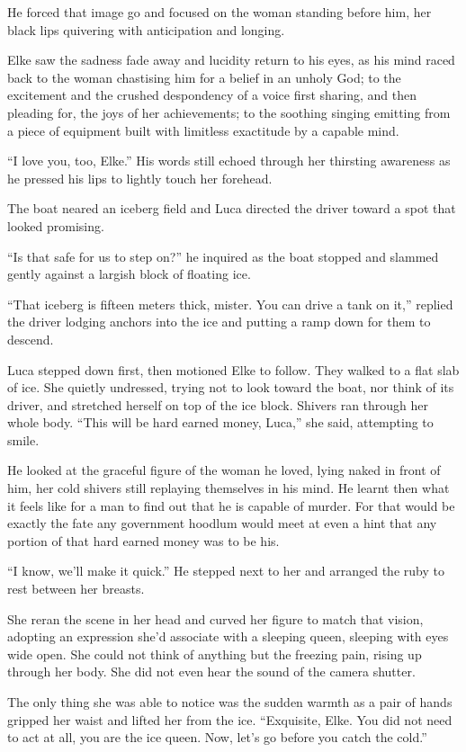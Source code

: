 He forced that image go and focused on the woman standing before him, her black lips quivering with anticipation and longing.

Elke saw the sadness fade away and lucidity return to his eyes, as his mind raced back to the woman chastising him for a belief in an unholy God; to the excitement and the crushed despondency of a voice first sharing, and then pleading for, the joys of her achievements; to the soothing singing emitting from a piece of equipment built with limitless exactitude by a capable mind.

``I love you, too, Elke.'' His words still echoed through her thirsting awareness as he pressed his lips to lightly touch her forehead.

The boat neared an iceberg field and Luca directed the driver toward a spot that looked promising.

``Is that safe for us to step on?'' he inquired as the boat stopped and slammed gently against a largish block of floating ice.

``That iceberg is fifteen meters thick, mister. You can drive a tank on it,'' replied the driver lodging anchors into the ice and putting a ramp down for them to descend.

Luca stepped down first, then motioned Elke to follow. They walked to a flat slab of ice. She quietly undressed, trying not to look toward the boat, nor think of its driver, and stretched herself on top of the ice block. Shivers ran through her whole body. ``This will be hard earned money, Luca,'' she said, attempting to smile.

He looked at the graceful figure of the woman he loved, lying naked in front of him, her cold shivers still replaying themselves in his mind. He learnt then what it feels like for a man to find out that he is capable of murder. For that would be exactly the fate any government hoodlum would meet at even a hint that any portion of that hard earned money was to be his.

``I know, we'll make it quick.'' He stepped next to her and arranged the ruby to rest between her breasts.

She reran the scene in her head and curved her figure to match that vision, adopting an expression she'd associate with a sleeping queen, sleeping with eyes wide open. She could not think of anything but the freezing pain, rising up through her body. She did not even hear the sound of the camera shutter.

The only thing she was able to notice was the sudden warmth as a pair of hands gripped her waist and lifted her from the ice. ``Exquisite, Elke. You did not need to act at all, you are the ice queen. Now, let's go before you catch the cold.''

